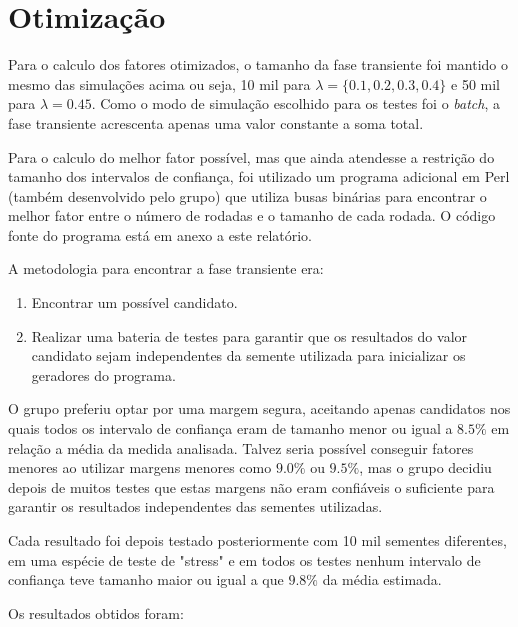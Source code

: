 \documentclass[a4paper,10pt]{article}
\begin{document}
\section{Otimização}

Para o calculo dos fatores otimizados, o tamanho da fase transiente foi mantido o mesmo das simulações acima ou seja, 10 mil para $\lambda = \{0.1, 0.2, 0.3, 0.4 \}$ e 50 mil para $\lambda = 0.45$. Como o modo de simulação escolhido para os testes foi o \emph{batch}, a fase transiente acrescenta apenas uma valor constante a soma total.

Para o calculo do melhor fator possível, mas que ainda atendesse a restrição do tamanho dos intervalos de confiança, foi utilizado um programa adicional em Perl (também desenvolvido pelo grupo) que utiliza busas binárias para encontrar o melhor fator entre o número de rodadas e o tamanho de cada rodada. O código fonte do programa está em anexo a este relatório.

A metodologia para encontrar a fase transiente era:
\begin{enumerate}
	\item Encontrar um possível candidato.
	\item Realizar uma bateria de testes para garantir que os resultados do valor candidato sejam independentes da semente utilizada para inicializar os geradores do programa.
\end{enumerate}

O grupo preferiu optar por uma margem segura, aceitando apenas candidatos nos quais todos os intervalo de confiança eram de tamanho menor ou igual a $8.5\%$ em relação a média da medida analisada. Talvez seria possível conseguir fatores menores ao utilizar margens menores como $9.0\%$ ou $9.5\%$, mas o grupo decidiu depois de muitos testes que estas margens não eram confiáveis o suficiente para garantir os resultados independentes das sementes utilizadas.

Cada resultado foi depois testado posteriormente com 10 mil sementes diferentes, em uma espécie de teste de "stress" e em todos os testes nenhum intervalo de confiança teve tamanho maior ou igual a que $9.8\%$ da média estimada.

Os resultados obtidos foram:
\end{document}
